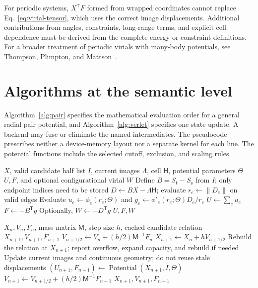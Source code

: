 \documentclass[11pt,a4paper]{article}
\newcommand{\mass}{\mathsf M}
\newcommand{\cell}{\mathsf H}
\newcommand{\src}{S_{\mathrm s}}
\newcommand{\dst}{S_{\mathrm t}}
\theoremstyle{definition}
\begin{document}
For periodic systems, $X^{\mathsf T}F$ formed from wrapped coordinates cannot replace
Eq.~\eqref{eq:virial-tensor}, which uses the correct image displacements. Additional
contributions from angles, constraints, long-range terms, and explicit cell dependence must be
derived from the complete energy or constraint definitions.
For a broader treatment of periodic virials with many-body potentials, see
Thompson, Plimpton, and Mattson~\cite{thompson2009}.
\section{Algorithms at the semantic level}
\label{app:algorithms}
Algorithm~\ref{alg:pair} specifies the mathematical evaluation order for a general radial pair
potential, and Algorithm~\ref{alg:verlet} specifies one state update. A backend may fuse or
eliminate the named intermediates. The pseudocode prescribes neither a device-memory layout nor
a separate kernel for each line. The potential functions include the selected cutoff, exclusion,
and scaling rules.

\begin{algorithm}[htbp]
\caption{Pair energy and force evaluation with incidence operators}\label{alg:pair}
\begin{algorithmic}[1]
\Require $X$, valid candidate half list $I$, current images $\Lambda$, cell $\cell$, potential parameters $\Theta$
\Ensure $U,F$, and optional configurational virial $W$
\State Define $B=\dst-\src$ from $I$; only endpoint indices need to be stored
\State $D\gets BX-\Lambda\cell$; evaluate $r_e\gets\|D_e\|$ on valid edges
\State Evaluate $u_e\gets\phi_e(r_e;\Theta)$ and $g_e\gets\phi'_e(r_e;\Theta)D_e/r_e$
\State $U\gets\sum_e u_e$
\State $F\gets-B^{\mathsf T}g$ 
\State Optionally, $W\gets-D^{\mathsf T}g$
\State \Return $U,F,W$
\end{algorithmic}
\end{algorithm}

\begin{algorithm}[htbp]
\caption{One velocity Verlet step with neighbor-validity checks}\label{alg:verlet}
\begin{algorithmic}[1]
\Require $X_n,V_n,F_n$, mass matrix $\mass$, step size $h$, cached candidate relation
\Ensure $X_{n+1},V_{n+1},F_{n+1}$
\State $V_{n+1/2}\gets V_n+(h/2)\mass^{-1}F_n$
\State $X_{n+1}\gets X_n+hV_{n+1/2}$
\State Rebuild the relation at $X_{n+1}$; report overflow, expand capacity, and rebuild if needed
\EndIf
\State Update current images and continuous geometry; do not reuse stale displacements
\State $(U_{n+1},F_{n+1})\gets\operatorname{Potential}(X_{n+1},I,\Theta)$
\State $V_{n+1}\gets V_{n+1/2}+(h/2)\mass^{-1}F_{n+1}$
\State \Return $X_{n+1},V_{n+1},F_{n+1}$
\end{algorithmic}
\end{algorithm}
\end{document}
